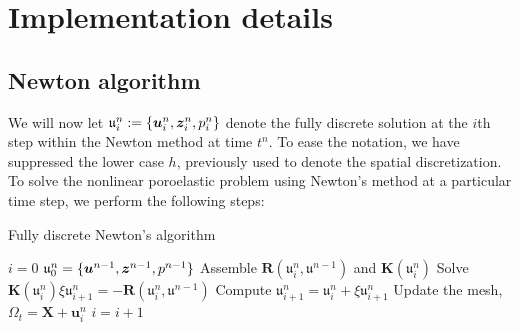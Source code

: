

\section{Implementation details}
\label{sec:implementation}


\subsection{Newton algorithm}
\label{sec:newton}
We will now let $\mathfrak{u}_{i}^{n}:=\{ \boldsymbol{u}_{i}^{n}, \boldsymbol{z}_{i}^{n}, p_{i}^{n} \} $ denote the fully discrete solution at the $i$th step within the Newton method at time $t^{n}$. To ease the notation, we have suppressed the lower case $h$, previously used to denote the spatial discretization. To solve the nonlinear poroelastic problem using Newton's method at a particular time step, we perform the following steps:
\begin{algorithm}[H]
\begin{algorithmic}[1]
  \caption{Fully discrete Newton's algorithm}
    \label{algo:newton}
  \STATE $i=0$
  \STATE $\mathfrak{u}_{0}^{n}=\{ \boldsymbol{u}^{n-1}, \boldsymbol{z}^{n-1}, p^{n-1} \} $
    \STATE Assemble  $\boldsymbol{R}(\mathfrak{u}_{i}^{n},\mathfrak{u}^{n-1})$ and $\boldsymbol{K}(\mathfrak{u}_{i}^{n})$
    \STATE Solve $\boldsymbol{K}(\mathfrak{u}_{i}^{n}) \xi\mathfrak{u}_{i+1}^{n} = -\boldsymbol{R}(\mathfrak{u}_{i}^{n},\mathfrak{u}^{n-1})$
    \STATE Compute $\mathfrak{u}_{i+1}^{n}=\mathfrak{u}_{i}^{n}+ \xi \mathfrak{u}_{i+1}^{n}$
    \STATE Update the mesh, $ \Omega_{t}= \boldsymbol{X} +\boldsymbol{u}_{i}^{n}$
    \STATE $i=i+1$
  \ENDWHILE
\end{algorithmic}
\end{algorithm}
